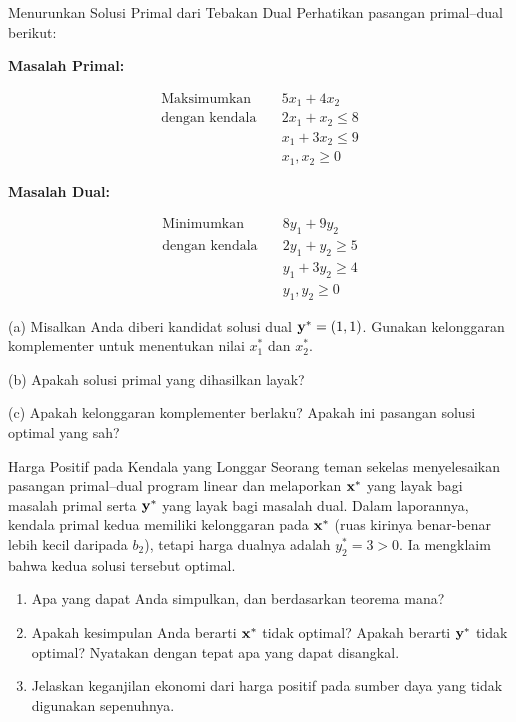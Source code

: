 \begin{ex}{Menurunkan Solusi Primal dari Tebakan Dual}{}
\label{ex:cs-dual-guess}
 Perhatikan pasangan primal--dual berikut:

\textbf{Masalah Primal:}

$$
\begin{aligned}
\text{Maksimumkan} \quad & 5x_1 + 4x_2 \\
\text{dengan kendala} \quad & 2x_1 + x_2 \leq 8 \\
& x_1 + 3x_2 \leq 9 \\
& x_1, x_2 \geq 0
\end{aligned}
$$

\textbf{Masalah Dual:}

$$
\begin{aligned}
\text{Minimumkan} \quad & 8y_1 + 9y_2 \\
\text{dengan kendala} \quad & 2y_1 + y_2 \geq 5 \\
& y_1 + 3y_2 \geq 4 \\
& y_1, y_2 \geq 0
\end{aligned}
$$

(a) Misalkan Anda diberi kandidat solusi dual $\mathbf{y}^* = (1, 1)$. Gunakan kelonggaran komplementer untuk menentukan nilai $x_1^*$ dan $x_2^*$.

(b) Apakah solusi primal yang dihasilkan layak?

(c) Apakah kelonggaran komplementer berlaku? Apakah ini pasangan solusi optimal yang sah?
\end{ex}


\begin{ex}{Harga Positif pada Kendala yang Longgar}{}
 Seorang teman sekelas menyelesaikan pasangan primal--dual program linear dan melaporkan $\mathbf{x}^*$ yang layak bagi masalah primal serta $\mathbf{y}^*$ yang layak bagi masalah dual. Dalam laporannya, kendala primal kedua memiliki kelonggaran pada $\mathbf{x}^*$ (ruas kirinya benar-benar lebih kecil daripada $b_2$), tetapi harga dualnya adalah $y_2^* = 3 > 0$. Ia mengklaim bahwa kedua solusi tersebut optimal.
\begin{enumerate}
\item Apa yang dapat Anda simpulkan, dan berdasarkan teorema mana?
\item Apakah kesimpulan Anda berarti $\mathbf{x}^*$ tidak optimal? Apakah berarti $\mathbf{y}^*$ tidak optimal? Nyatakan dengan tepat apa yang dapat disangkal.
\item Jelaskan keganjilan ekonomi dari harga positif pada sumber daya yang tidak digunakan sepenuhnya.
\end{enumerate}
\end{ex}

